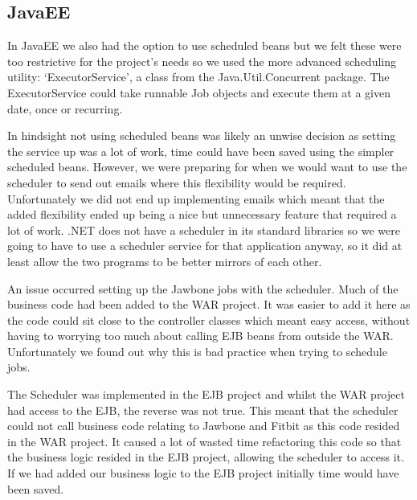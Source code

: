 \subsection{JavaEE}
In JavaEE we also had the option to use scheduled beans but we felt these were too restrictive for the project’s needs so we used the more advanced scheduling utility: ‘ExecutorService’, a class from the Java.Util.Concurrent package. The ExecutorService could take runnable Job objects and execute them at a given date, once or recurring. \par
In hindsight not using scheduled beans was likely an unwise decision as setting the service up was a lot of work, time could have been saved using the simpler scheduled beans. However, we were preparing for when we would want to use the scheduler to send out emails where this flexibility would be required. Unfortunately we did not end up implementing emails which meant that the added flexibility ended up being a nice but unnecessary feature that required a lot of work. .NET does not have a scheduler in its standard libraries so we were going to have to use a scheduler service for that application anyway, so it did at least allow the two programs to be better mirrors of each other. \par
An issue occurred setting up the Jawbone jobs with the scheduler. Much of the business code had been added to the WAR project. It was easier to add it here as the code could sit close to the controller classes which meant easy access, without having to worrying too much about calling EJB beans from outside the WAR. Unfortunately we found out why this is bad practice when trying to schedule jobs. \par
The Scheduler was implemented in the EJB project and whilst the WAR project had access to the EJB, the reverse was not true. This meant that the scheduler could not call business code relating to Jawbone and Fitbit as this code resided in the WAR project. It caused a lot of wasted time refactoring this code so that the business logic resided in the EJB project, allowing the scheduler to access it. If we had added our business logic to the EJB project initially time would have been saved. 
